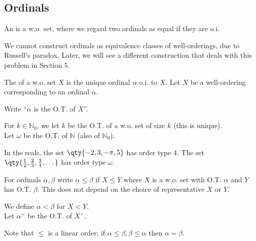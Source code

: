 \subsection{Ordinals}
\begin{definition}[Ordinal]
    An  is a w.o. set, where we regard two ordinals as equal if they are o.i.
\end{definition}

\begin{remark}
    We cannot construct ordinals as equivalence classes of well-orderings, due to Russell's paradox.
    Later, we will see a different construction that deals with this problem in Section 5.
\end{remark}

\begin{definition}
    The  of a w.o. set $X$ is the unique ordinal $\alpha$ o.i. to $X$.
    Let $X$ be a well-ordering corresponding to an ordinal $\alpha$.
\end{definition}

\begin{notation}
    Write ``$\alpha$ is the O.T. of $X$''.
\end{notation}

\begin{example}
    For $k \in \mathbb{N}_0$, we let $k$ be the O.T. of a w.o. set of size $k$ (this is unique). \\
    Let $\omega$ be the O.T. of $\mathbb{N}$ (also of $\mathbb{N}_0$).
\end{example}

\begin{example}
    In the reals, the set $\qty{-2, 3, -\pi, 5}$ has order type 4.
    The set $\qty{\frac{1}{2}, \frac{2}{3}, \frac{3}{4}, \dots}$ has order type $\omega$.
\end{example}

\begin{note}
    For ordinals $\alpha, \beta$ write $\alpha \leq \beta$ if $X \leq Y$ where $X$ is a w.o. set with O.T. $\alpha$ and $Y$ has O.T. $\beta$.
    This does not depend on the choice of representative $X$ or $Y$.

    We define $\alpha < \beta$ for $X < Y$. \\
    Let $\alpha^+$ be the O.T. of $X^+$.
\end{note}

\begin{remark}
    Note that $\leq$ is a linear order; if $\alpha \leq \beta, \beta \leq \alpha$ then $\alpha = \beta$.
\end{remark}

